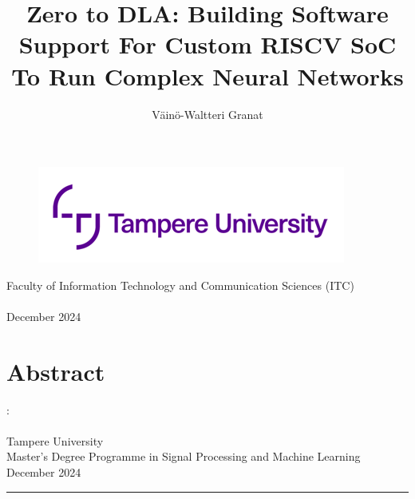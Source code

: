 \documentclass[12pt,a4paper,english
]{tunithesis}
\author{Väinö-Waltteri Granat}
\title{Zero to DLA: Building Software Support For Custom RISCV SoC To Run Complex Neural Networks} %
\begin{document}
\makeatletter

\thispagestyle{empty}
\vspace*{-.5cm}\noindent

\begin{figure}
    \vspace{-1.3cm}
    \advance\leftskip-2.5cm
    \noindent\includegraphics{img/tunilogo.png}
\end{figure}
 
\vspace{2.5cm}
\begin{flushright}
\noindent\textsf{\LARGE{\@author}}

\noindent\vspace{0.5cm}

\noindent\Huge{\textsf{\textbf{\textcolor{tunipurple}{\@title}}}}
\end{flushright}
\vspace{13.7cm} %

\begin{flushright}  
    \begin{spacing}{1.0}
      \textsf{Faculty of Information Technology and Communication Sciences (ITC)\\
      \@thesistype\\
      December 2024}
    \end{spacing}
\end{flushright}

\if@twoside
\clearpage
\fi


\chapter*{Abstract}

\begin{spacing}{1.0}
\noindent \@author: \@title\\
\@thesistype\\
Tampere University\\
Master’s Degree Programme in Signal Processing and Machine Learning\\
December 2024
\end{spacing}
\noindent\rule{12cm}{0.4pt}
\end{document}
